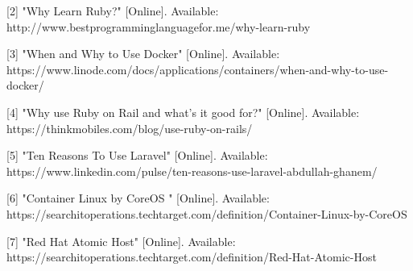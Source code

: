 \documentclass[onecolumn, draftclsnofoot,10pt, compsoc]{IEEEtran}
\begin{document}
[2] "Why Learn Ruby?" [Online]. Available: http://www.bestprogramminglanguagefor.me/why-learn-ruby

[3] "When and Why to Use Docker" [Online]. Available: https://www.linode.com/docs/applications/containers/when-and-why-to-use-docker/

[4] "Why use Ruby on Rail and what’s it good for?" [Online]. Available: https://thinkmobiles.com/blog/use-ruby-on-rails/

[5] "Ten Reasons To Use Laravel" [Online]. Available: https://www.linkedin.com/pulse/ten-reasons-use-laravel-abdullah-ghanem/

[6] "Container Linux by CoreOS " [Online]. Available: https://searchitoperations.techtarget.com/definition/Container-Linux-by-CoreOS

[7] "Red Hat Atomic Host" [Online]. Available: https://searchitoperations.techtarget.com/definition/Red-Hat-Atomic-Host  
\end{document}
